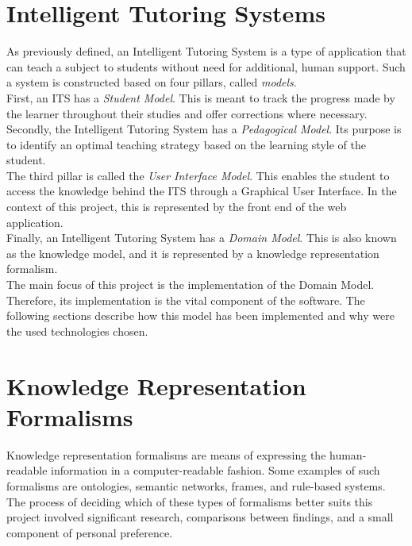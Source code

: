 \documentclass[12pt]{report}
\begin{document}
	\section{Intelligent Tutoring Systems}
	As previously defined, an Intelligent Tutoring System is a type of application that can teach a subject to students without need for additional, human support. Such a system is constructed based on four pillars, called \emph{models}.\\
	First, an ITS has a \emph{Student Model}. This is meant to track the progress made by the learner throughout their studies and offer corrections where necessary.\\
	Secondly, the Intelligent Tutoring System has a \emph{Pedagogical Model}. Its purpose is to identify an optimal teaching strategy based on the learning style of the student.\\
	The third pillar is called the \emph{User Interface Model}. This enables the student to access the knowledge behind the ITS through a Graphical User Interface. In the context of this project, this is represented by the front end of the web application.\\
	Finally, an Intelligent Tutoring System has a \emph{Domain Model}. This is also known as the knowledge model, and it is represented by a knowledge representation formalism.\\
    The main focus of this project is the implementation of the Domain Model. Therefore, its implementation is the vital component of the software. The following sections describe how this model has been implemented and why were the used technologies chosen.
	
	\section{Knowledge Representation Formalisms}
	Knowledge representation formalisms are means of expressing the human-readable information in a computer-readable fashion. Some examples of such formalisms are ontologies, semantic networks, frames, and rule-based systems.\\
	The process of deciding which of these types of formalisms better suits this project involved significant research, comparisons between findings, and a small component of personal preference.
	
\end{document}
